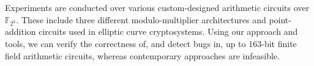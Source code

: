 Experiments are conducted over various custom-designed arithmetic
circuits over $\mathbb{F}_{2^k}$. These include three different
modulo-multiplier architectures and point-addition circuits used in
elliptic curve cryptosystems. Using our approach and tools, we can
verify the correctness of, and detect bugs in, up to $163$-bit finite
field arithmetic circuits, whereas contemporary approaches are
infeasible. 







